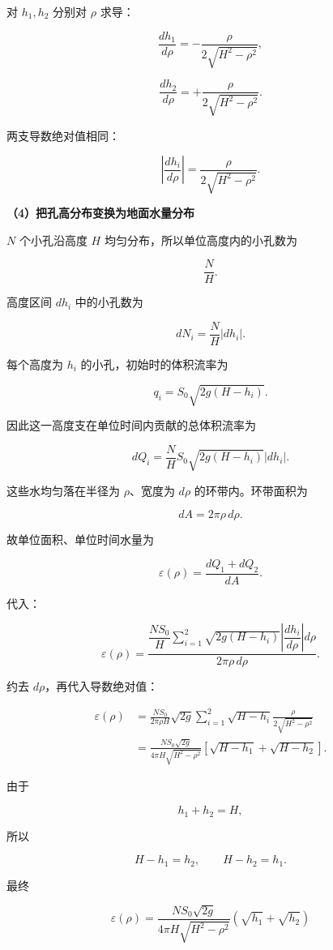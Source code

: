 \documentclass[12pt,a4paper,UTF8]{ctexart}
\begin{document}
对 \(h_1,h_2\) 分别对 \(\rho\) 求导：

\[\frac{dh_1}{d\rho}
=-\frac{\rho}{2\sqrt{H^2-\rho^2}},\]

\[\frac{dh_2}{d\rho}
=+\frac{\rho}{2\sqrt{H^2-\rho^2}}.\]

两支导数绝对值相同：

\[\left|\frac{dh_i}{d\rho}\right|
=\frac{\rho}{2\sqrt{H^2-\rho^2}}.\]

\textbf{（4）把孔高分布变换为地面水量分布}

\(N\) 个小孔沿高度 \(H\) 均匀分布，所以单位高度内的小孔数为

\[\frac NH.\]

高度区间 \(dh_i\) 中的小孔数为

\[dN_i=\frac NH|dh_i|.\]

每个高度为 \(h_i\) 的小孔，初始时的体积流率为

\[q_i=S_0\sqrt{2g(H-h_i)}.\]

因此这一高度支在单位时间内贡献的总体积流率为

\[dQ_i
=\frac NH
S_0\sqrt{2g(H-h_i)}
|dh_i|.\]

这些水均匀落在半径为 \(\rho\)、宽度为 \(d\rho\) 的环带内。环带面积为

\[dA=2\pi\rho\,d\rho.\]

故单位面积、单位时间水量为

\[\varepsilon(\rho)
=\frac{dQ_1+dQ_2}{dA}.\]

代入：

\[\varepsilon(\rho)
=\frac{
\dfrac{NS_0}{H}
\sum_{i=1}^{2}
\sqrt{2g(H-h_i)}
\left|\dfrac{dh_i}{d\rho}\right|d\rho
}{
2\pi\rho\,d\rho
}.\]

约去 \(d\rho\)，再代入导数绝对值：

\[\begin{aligned}
\varepsilon(\rho)
&=\frac{NS_0}{2\pi\rho H}
\sqrt{2g}
\sum_{i=1}^{2}
\sqrt{H-h_i}
\frac{\rho}{2\sqrt{H^2-\rho^2}}\\
&=\frac{NS_0\sqrt{2g}}
{4\pi H\sqrt{H^2-\rho^2}}
\left[
\sqrt{H-h_1}+\sqrt{H-h_2}
\right].
\end{aligned}\]

由于

\[h_1+h_2=H,\]

所以

\[H-h_1=h_2,\qquad H-h_2=h_1.\]

最终

\[\boxed{
\varepsilon(\rho)
=
\frac{NS_0\sqrt{2g}}
{4\pi H\sqrt{H^2-\rho^2}}
\left(\sqrt{h_1}+\sqrt{h_2}\right)
}\]
\end{document}
